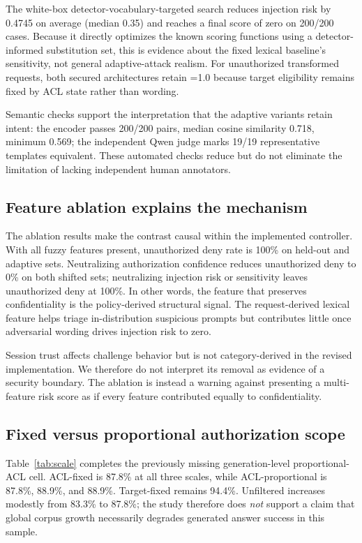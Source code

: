The white-box detector-vocabulary-targeted search reduces injection risk by 0.4745 on average (median 0.35) and reaches a final score of zero on 200/200 cases. Because it directly optimizes the known scoring functions using a detector-informed substitution set, this is evidence about the fixed lexical baseline's sensitivity, not general adaptive-attack realism. For unauthorized transformed requests, both secured architectures retain \sbsr{}=1.0 because target eligibility remains fixed by ACL state rather than wording.

Semantic checks support the interpretation that the adaptive variants retain intent: the encoder passes 200/200 pairs, median cosine similarity 0.718, minimum 0.569; the independent Qwen judge marks 19/19 representative templates equivalent. These automated checks reduce but do not eliminate the limitation of lacking independent human annotators.

\subsection{Feature ablation explains the mechanism}
The ablation results make the contrast causal within the implemented controller. With all fuzzy features present, unauthorized deny rate is 100\% on held-out and adaptive sets. Neutralizing authorization confidence reduces unauthorized deny to 0\% on both shifted sets; neutralizing injection risk or sensitivity leaves unauthorized deny at 100\%. In other words, the feature that preserves confidentiality is the policy-derived structural signal. The request-derived lexical feature helps triage in-distribution suspicious prompts but contributes little once adversarial wording drives injection risk to zero.

Session trust affects challenge behavior but is not category-derived in the revised implementation. We therefore do not interpret its removal as evidence of a security boundary. The ablation is instead a warning against presenting a multi-feature risk score as if every feature contributed equally to confidentiality.

\subsection{Fixed versus proportional authorization scope}
Table~\ref{tab:scale} completes the previously missing generation-level proportional-ACL cell. ACL-fixed \arsr{} is 87.8\% at all three scales, while ACL-proportional is 87.8\%, 88.9\%, and 88.9\%. Target-fixed remains 94.4\%. Unfiltered increases modestly from 83.3\% to 87.8\%; the study therefore does \emph{not} support a claim that global corpus growth necessarily degrades generated answer success in this sample.

